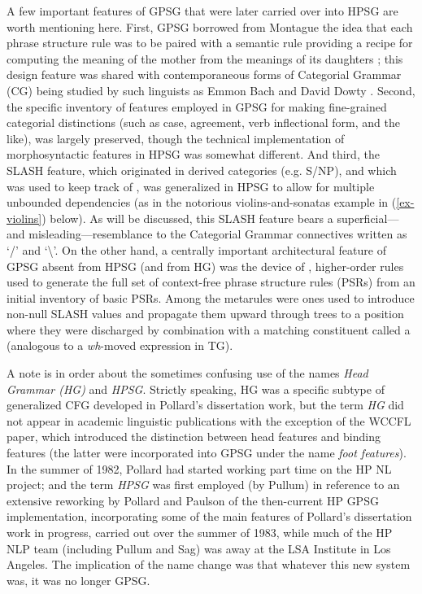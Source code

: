 \documentclass[output=paper]{langsci/langscibook}
\begin{document}
A few important features of GPSG that were later carried over into HPSG are worth mentioning here. First, GPSG borrowed from Montague the idea that each phrase structure rule was to be paired with a semantic rule providing a recipe for computing the meaning of the mother from the meanings of its daughters \citep[]{Gazdar81}; this design feature was shared with contemporaneous forms of Categorial Grammar (CG) being studied by such linguists as Emmon Bach \citep{Bach79a,Bach80a} and David Dowty \citep{Dowty82a-u,Dowty82b}.  Second, the specific inventory of features employed in GPSG for making fine-grained categorial distinctions (such as case, agreement, verb inflectional form, and the like), was largely preserved, though the technical implementation of morphosyntactic features in HPSG was somewhat different. And third, the SLASH feature, which originated in  derived categories (e.g. S/NP), and which was used to keep track of , was generalized in HPSG to allow for multiple unbounded dependencies (as in the notorious violins-and-sonatas example in (\ref{ex-violins}) below). As will be discussed, this SLASH feature bears a superficial---and misleading---resemblance to the Categorial Grammar connectives written as `/' and `\textbackslash'. On the other hand, a centrally important architectural feature of GPSG absent from HPSG (and from HG) was the device of , higher-order rules used to generate the full set of context-free phrase structure rules (PSRs) from an initial inventory of basic PSRs. Among the metarules were ones used to introduce non-null SLASH values and propagate them upward through trees to a position where they were discharged by combination with a matching constituent called a  (analogous to a \emph{wh}-moved expression in TG).

A note is in order about the sometimes confusing use of the names \emph{Head Grammar (HG)} and \emph{HPSG}. Strictly speaking, HG was a specific subtype of generalized CFG developed in Pollard's dissertation work, but the term \emph{HG} did not appear in academic linguistic publications with the exception of the \citet{PollardSag1983} WCCFL paper, which introduced the distinction between head features and binding features (the latter were incorporated into GPSG under the name \emph{foot features}). In the summer of 1982, Pollard had started working part time on the HP NL project; and the term \emph{HPSG} was first employed (by Pullum) in reference to an extensive reworking by Pollard and Paulson of the then-current HP GPSG implementation, incorporating some of the main features of Pollard's dissertation work in progress, carried out over the summer of 1983, while much of the HP NLP team (including Pullum and Sag) was away at the LSA Institute in Los Angeles.  The implication of the name change was that whatever this new system was, it was no longer GPSG.
\end{document}
